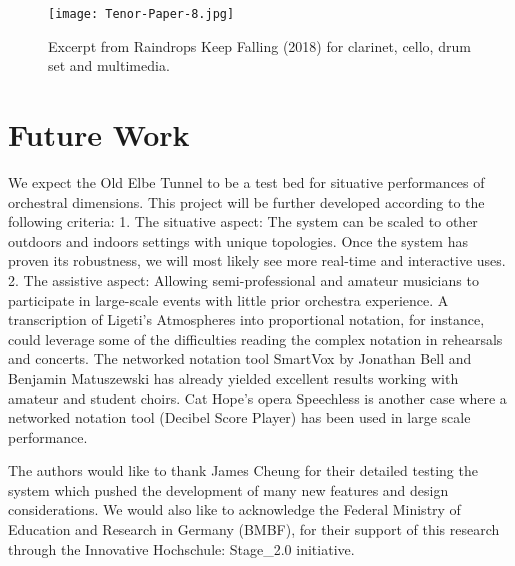\begin{figure*}[h]
    \centering
    \begin{minipage}{0.6\textwidth}
        \centering
        \texttt{[image: Tenor-Paper-8.jpg]} 
       	\caption{Excerpt from Raindrops Keep Falling (2018) for clarinet, cello, drum set and multimedia.
\label{fig:Tenor-Paper-8}}
    \end{minipage}
\end{figure*}




\section{Future Work}
We expect the Old Elbe Tunnel to be a test bed for situative performances of orchestral dimensions. This project will be further developed according to the following criteria: 
1. The situative aspect: The system can be scaled to other outdoors and indoors settings with unique topologies. Once the system has proven its robustness, we will  most likely see more real-time and interactive uses.
2. The assistive aspect: Allowing semi-professional and amateur musicians to participate in large-scale events with little prior orchestra experience. A transcription of Ligeti's Atmospheres into proportional notation, for instance, could leverage some of the difficulties reading the complex notation in rehearsals and concerts. The networked notation tool SmartVox by Jonathan Bell and Benjamin Matuszewski has already yielded excellent results working with amateur and student choirs. Cat Hope's opera Speechless is another case where a networked notation tool (Decibel Score Player) has been used in large scale performance.

\begin{acknowledgments}
The authors would like to thank James Cheung for their detailed testing the system which pushed the development of many new features and design considerations. We would also like to acknowledge the Federal Ministry of Education and Research in Germany (BMBF), for their support of this research through the Innovative Hochschule: Stage\_2.0 initiative.
\end{acknowledgments} 

\balance






